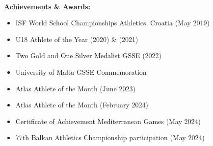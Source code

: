 \documentclass[11pt,a4paper]{article}
\begin{document}
\noindent \\
\textbf{Achievements \& Awards:}
\begin{itemize}
  \item ISF World School Championships Athletics, Croatia (May 2019)
  \item U18 Athlete of the Year (2020) \& (2021)
  \item Two Gold and One Silver Medalist GSSE (2022)
  \item University of Malta GSSE Commemoration
  \item Atlas Athlete of the Month (June 2023)
  \item Atlas Athlete of the Month (February 2024)
  \item Certificate of Achievement Mediterranean Games (May 2024)
  \item 77th Balkan Athletics Championship participation (May 2024)
\end{itemize}
\end{document}
